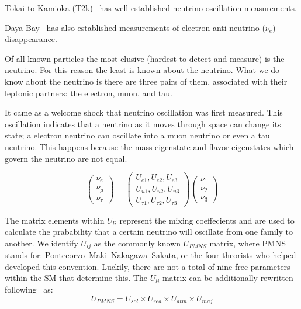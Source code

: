 Tokai to Kamioka (T2k)~\citep{PhysRevD.91.072010_t2k_2015} has well established neutrino oscillation measurements.

Daya Bay~\citep{daya_bay_2012_neutrino_PhysRevLett.108.171803} has also established measurements of electron anti-neutrino ($\bar{\nu_{e}}$) disappearance.

Of all known particles the most elusive (hardest to detect and measure) is the neutrino.
For this reason the least is known about the neutrino.
What we do know about the neutrino is there are three pairs of them, associated with their leptonic partners: the electron, muon, and tau.

It came as a welcome shock that neutrino oscillation was first measured.
This oscillation indicates that a neutrino as it moves through space can change its state; a electron neutrino can oscillate into a muon neutrino or even a tau neutrino.
This happens because the mass eigenstate and flavor eigenstates which govern the neutrino are not equal.

\begin{equation}
\begin{pmatrix}
\nu_e\\
\nu_{\mu}\\
\nu_{\tau}
\end{pmatrix}
=
\begin{pmatrix}
U_{e1}, U_{e2}, U_{e3} \\
U_{u1}, U_{u2}, U_{u3} \\
U_{\tau1}, U_{\tau2}, U_{\tau3}
\end{pmatrix}
\begin{pmatrix}
\nu_1\\
\nu_2\\
\nu_3
\end{pmatrix}
\end{equation}

The matrix elements within $U_{li}$ represent the mixing coeffecients and are used to calculate the prabability that a certain neutrino will oscillate from one family to another.
We identify $U_{ij}$ as the commonly known $U_{PMNS}$ matrix, where PMNS stands for: Pontecorvo–Maki–Nakagawa–Sakata, or the four theorists who helped developed this convention.
Luckily, there are not a total of nine free parameters within the SM that determine this.
The $U_{li}$ matrix can be additionally rewritten following~\citep{Pontecorvo:1957qd, 1962PThPh..28..870M} as:
\begin{equation}
U_{PMNS}
=
U_{sol} \times U_{rea} \times U_{atm} \times U_{maj}
\end{equation}
~\label{eq:uij_matrix_simp}

